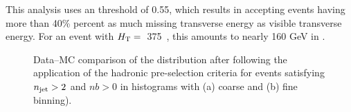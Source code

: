 This analysis uses an \alphat threshold of 0.55, which results in accepting
events having more than 40\% percent as much missing transverse energy as visible transverse
energy. For an event with $\mbox{$H_\text{T}$}=$~375~\gev, this amounts to nearly 160 GeV in \mht.  
%
\begin{figure}[!h]
  \centering
  \caption{Data--MC comparison of the \alphat distribution after 
           following the application of the hadronic pre-selection 
           criteria for events satisfying $n_{\text{jet}} > 2$ and $nb > 0$ 
           in histograms with (a) coarse and (b) fine binning). }
  \label{fig:figures_AlphaT_all}
\end{figure}

\FloatBarrier
